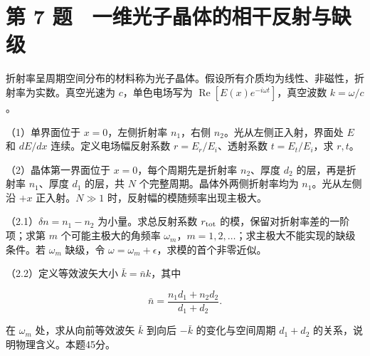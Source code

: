 \documentclass[12pt,a4paper,fontset=fandol]{ctexart}
\begin{document}
\clearpage

\section{第 7
题　一维光子晶体的相干反射与缺级}\label{ux7b2c-7-ux9898-ux4e00ux7ef4ux5149ux5b50ux6676ux4f53ux7684ux76f8ux5e72ux53cdux5c04ux4e0eux7f3aux7ea7}

折射率呈周期空间分布的材料称为光子晶体。假设所有介质均为线性、非磁性，折射率为实数。真空光速为
\(c\)，单色电场写为 \(\operatorname{Re}[E(x)e^{-i\omega t}]\)，真空波数
\(k=\omega/c\)。

（1）单界面位于 \(x=0\)，左侧折射率 \(n_1\)，右侧
\(n_2\)。光从左侧正入射，界面处 \(E\) 和 \(dE/dx\)
连续。定义电场幅反射系数 \(r=E_r/E_i\)、透射系数 \(t=E_t/E_i\)，求
\(r,t\)。

（2）晶体第一界面位于 \(x=0\)，每个周期先是折射率 \(n_2\)、厚度 \(d_2\)
的层，再是折射率 \(n_1\)、厚度 \(d_1\) 的层，共 \(N\)
个完整周期。晶体外两侧折射率均为 \(n_1\)。光从左侧沿 \(+x\)
正入射。\(N\gg1\) 时，反射幅的模随频率出现主极大。

（2.1）\(\delta n=n_1-n_2\) 为小量。求总反射系数 \(r_{\rm tot}\)
的模，保留对折射率差的一阶项；求第 \(m\) 个可能主极大的角频率
\(\omega_m\)，\(m=1,2,\ldots\)；求主极大不能实现的缺级条件。若
\(\omega_m\) 缺级，令 \(\omega=\omega_m+\epsilon\)，求模的首个非零近似。

（2.2）定义等效波矢大小 \(\bar k=\bar n k\)，其中

\[
\bar n=\frac{n_1d_1+n_2d_2}{d_1+d_2}.
\]

在 \(\omega_m\) 处，求从向前等效波矢 \(\bar k\) 到向后 \(-\bar k\)
的变化与空间周期 \(d_1+d_2\) 的关系，说明物理含义。本题45分。
\end{document}
